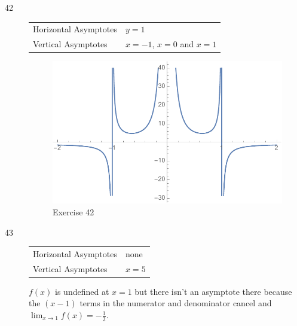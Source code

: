 \documentclass[letterpaper, landscape]{exam}
\begin{document}
\begin{description}
      \item[42]
        \begin{tabular}[H]{ll}
          \toprule
          Horizontal Asymptotes & $y = 1$ \\
          Vertical Asymptotes   & $x = -1$, $x = 0$ and $x = 1$ \\
          \bottomrule
        \end{tabular}

        \begin{figure}[H]
          \centering
          \includegraphics[scale = 0.5]{ex42.pdf}
          \caption{Exercise 42}
          \label{fig:ex42}
        \end{figure}

      \newpage

      \item[43]
        \begin{tabular}[H]{ll}
          \toprule
          Horizontal Asymptotes & none \\
          Vertical Asymptotes   & $x = 5$ \\
          \bottomrule
        \end{tabular}

        $f(x)$ is undefined at $x = 1$ but there isn't an asymptote there because the
        $(x - 1)$ terms in the numerator and denominator cancel and 
        $\lim_{x \to 1} f(x) = -\frac{1}{2}$.


\end{description}
\end{document}
